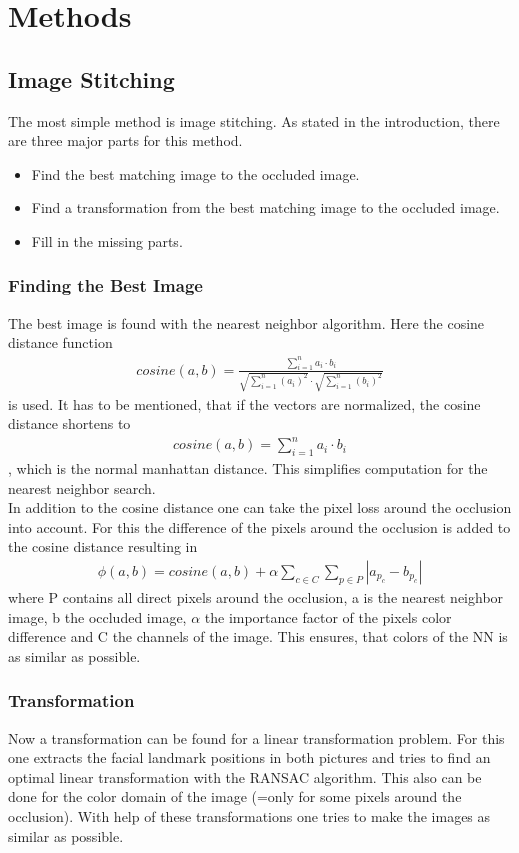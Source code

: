 \documentclass[
     11pt,         %
     a4paper,      %
     oneside,
     ]{article}
\begin{document}
\section{Methods}
\subsection{Image Stitching}
The most simple method is image stitching. As stated in the introduction, there are three major parts for this method.
\begin{itemize}
  \item Find the best matching image to the occluded image.
  \item Find a transformation from the best matching image to the occluded image.
  \item Fill in the missing parts.
\end{itemize}
\subsubsection{Finding the Best Image}
The best image is found with the nearest neighbor algorithm. Here the cosine distance function
\begin{align*}
  cosine(a,b) = \frac{\sum^n_{i=1} a_i \cdot b_i}{ \sqrt{\sum^n_{i=1} (a_i)^2} \cdot \sqrt{\sum^n_{i=1} (b_i)^2} }
\end{align*}
is used. It has to be mentioned, that if the vectors are normalized, the cosine distance shortens to
\begin{align*}
  cosine(a,b) = \sum^n_{i=1} a_i \cdot b_i
\end{align*}
, which is the normal manhattan distance. This simplifies computation for the nearest neighbor search. \\
In addition to the cosine distance one can take the pixel loss around the occlusion into account. For this the difference of the pixels around the occlusion is added to the cosine distance resulting in
\begin{align*}
  \phi(a,b)=cosine(a,b)+ \alpha \sum_{c \in C} \sum_{p \in P} |a_{p_c}-b_{p_c}|
\end{align*}
where P contains all direct pixels around the occlusion, a is the nearest neighbor image, b the occluded image, $\alpha$ the importance factor of the pixels color difference and C the channels of the image. This ensures, that colors of the NN is as similar as possible.

\subsubsection{Transformation}
Now a transformation can be found for a linear transformation problem. For this one extracts the facial landmark positions in both pictures and tries to find an optimal linear transformation with the RANSAC algorithm. This also can be done for the color domain of the image (=only for some pixels around the occlusion). With help of these transformations one tries to make the images as similar as possible.
\end{document}
